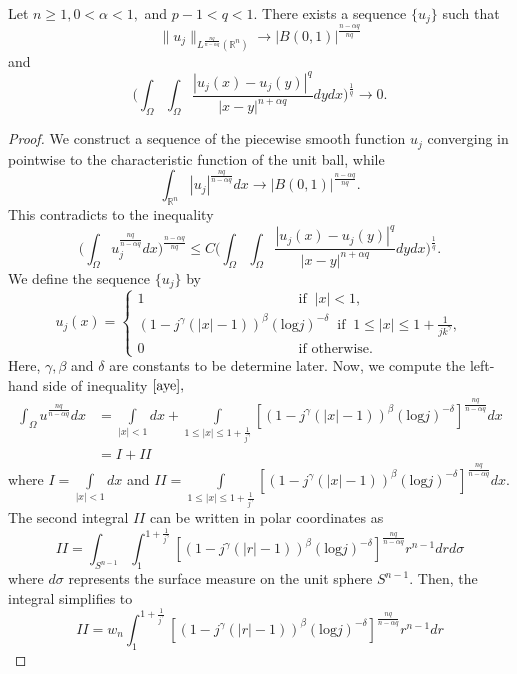 \documentclass[10pt,a4paper]{amsart}
\newcommand{\R}{\mathbb{R}}
\newcommand{\be}{\begin{equation}}
\newcommand{\ee}{\end{equation}}
\begin{document}
\begin{Thm}
Let $n\geq 1, 0<\alpha<1,$ and $p-1<q<1.$ There exists a sequence $\{u_{j}\}$ such that
\[
\|u_{j}\|_{L^{\frac{nq}{n-\alpha q}}(\R^{n})}\to |B(0,1)|^{\frac{n-\alpha q}{nq}}
\]
and
\[
\Big(\int_{\Omega}\int_{\Omega}\frac{|u_{j}(x)-u_{j}(y)|^{q}}{|x-y|^{n+\alpha q}} dydx\Big)^{\frac{1}{q}}\to 0.
\]
\end{Thm}

\begin{proof}
We construct a sequence of the piecewise smooth function $u_{j}$ converging in pointwise to the characteristic function of the unit ball, while
\[
\int_{\R^{n}} |u_{j}|^{\frac{nq}{n-\alpha q}}dx \to |B(0,1)|^{\frac{n-\alpha q}{nq}}.
\]
This contradicts to the inequality
\be\label{aye}
\big( \int_{\Omega} u_{j}^{\frac{nq}{n-\alpha q}} dx\big)^{\frac{n-\alpha q}{nq}}\leq C \Big(\int_{\Omega}\int_{\Omega}\frac{|u_{j}(x)-u_{j}(y)|^{q}}{|x-y|^{n+\alpha q}} dydx\Big)^{\frac{1}{q}}.
\ee
We define the sequence $\{u_{j}\}$ by
\[
u_{j}(x)=
\begin{cases}
1\qquad\qquad\qquad\qquad\qquad\quad\text{if}\;\; |x|<1,\\
(1-j^{\gamma}(|x|-1))^{\beta}(\mathrm{log}j)^{-\delta}\;\;\text{if}\;\; 1\leq |x|\leq 1+\frac{1}{jk^{\gamma}},\\
0\qquad\qquad\qquad\qquad\quad\quad\quad\text{if otherwise}.
\end{cases}
\]
Here, $\gamma, \beta$ and $\delta$ are constants to be determine later.
Now, we compute the left-hand side of inequality $\eqref{aye},$
\begin{align*}
\int_{\Omega}u^{\frac{nq}{n-\alpha q}}dx&=\int\limits_{|x|<1}dx+\int\limits_{1\leq |x|\leq 1+\frac{1}{j^{\gamma}}} [(1-j^{\gamma}(|x|-1))^{\beta}(\mathrm{log} j)^{-\delta}] ^{\frac{nq}{n-\alpha q}}dx\\
&= I +II
\end{align*}
where $I=\int\limits_{|x|<1}dx$ and $II=\int\limits_{1\leq |x|\leq 1+\frac{1}{j^{\gamma}}} [(1-j^{\gamma}(|x|-1))^{\beta}(\mathrm{log} j)^{-\delta}] ^{\frac{nq}{n-\alpha q}}dx.$
The second integral $II$ can be written in polar coordinates as
\[
II=\int_{S^{n-1}} \int_{1}^{1+\frac{1}{j^{\gamma}}} [(1-j^{\gamma}(|r|-1))^{\beta}(\mathrm{log}j)^{-\delta}] ^{\frac{nq}{n-\alpha q}} r^{n-1}dr d\sigma
\]
where $d\sigma$ represents the surface measure on the unit sphere $S^{n-1}.$ 
Then, the integral simplifies to
\[
II= w_{n}\int_{1}^{1+\frac{1}{j^{\gamma}}} [(1-j^{\gamma}(|r|-1))^{\beta}(\mathrm{log} j)^{-\delta}] ^{\frac{nq}{n-\alpha q}} r^{n-1}dr
\]

\end{proof}
\end{document}
